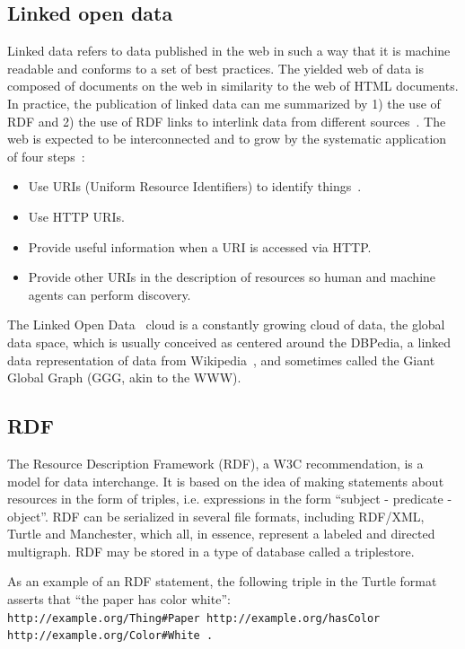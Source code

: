 \documentclass[data,datadescriptor,submit,moreauthors,pdftex]{Definitions/mdpi}
\newcommand{\te}[1] {\texttt{\footnotesize#1}}
\begin{document}
\subsection{Linked open data}
Linked data refers to data published in the web in such a way that it is
machine readable and conforms to a set of best practices.
The yielded web of data is composed of documents on the web
in similarity to the web of HTML documents.
In practice, the publication of linked data can me summarized
by 1) the use of RDF and 2) the use of RDF
links to interlink data from different sources~\cite{ld1,ld2}.
The web is expected to be interconnected and to
grow by the systematic application of four
steps~\cite{lee1}:
\begin{itemize}
  \item Use URIs (Uniform Resource Identifiers) to identify things~\cite{uri}.
    \item Use HTTP URIs.
    \item Provide useful information when a URI is accessed via HTTP.
    \item Provide other URIs in the description of resources so human
        and machine agents can perform discovery.
\end{itemize}

The Linked Open Data~\cite{lod} cloud is a constantly growing cloud of data,
the global data space, which is usually
conceived as centered around the DBPedia, a linked data representation
of data from Wikipedia~\cite{dbpedia0,dbpedia},
and sometimes called the Giant Global Graph (GGG, akin to the WWW).

\subsection{RDF}
The Resource Description Framework (RDF), a W3C
recommendation, is a model for data
interchange.
It is based on the idea of making statements about resources in the form
of triples, i.e. expressions in the form ``subject - predicate -
object''.
RDF can be serialized in several file formats, including RDF/XML,
Turtle and Manchester, which all, in essence, represent a labeled and
directed multigraph.
RDF may be stored in a type of database called a triplestore.~\cite{rdf}

As an example of an RDF statement, the following triple in the Turtle
format asserts that ``the paper has color white'':\\
\te{http://example.org/Thing\#Paper http://example.org/hasColor\\
http://example.org/Color\#White .}
\end{document}
